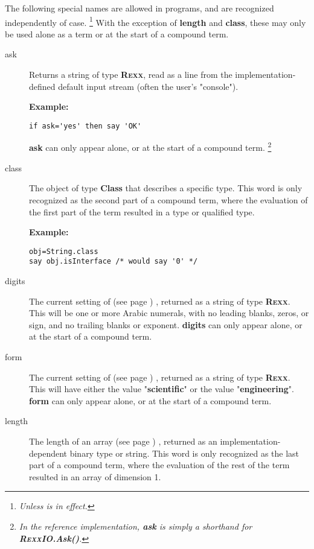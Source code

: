 The following special names are allowed in \nr{} programs, and are
recognized independently of case.
\footnote{
\emph{Unless  is in effect.
}
}
With the exception of \textbf{length} and \textbf{class}, these
may only be used alone as a term or at the start of a compound term.
\begin{description}
\item[ask]\label{refswask}
 
Returns a string of type \textbf{R\textsc{exx}}, read as a line from the
implementation-defined default input stream (often the user's
"console").

\textbf{Example:}
\begin{lstlisting}
if ask='yes' then say 'OK'
\end{lstlisting}
 \textbf{ask} can only appear alone, or at the start of a
compound term.
\footnote{
\emph{In the reference implementation, \textbf{ask} is simply a shorthand
for \textbf{R\textsc{exx}IO.Ask()}.}
}
\item[class]\label{refswclass}
 
The object of type \textbf{Class} that describes a specific type.
This word is only recognized as the second part of a compound term,
where the evaluation of the first part of the term resulted in a
type or qualified type.

\textbf{Example:}
\begin{lstlisting}
obj=String.class
say obj.isInterface /* would say '0' */
\end{lstlisting}
\item[digits]\label{refswdigit}
 The current setting of   (see page \pageref{refndigits}) ,
returned as a string of type \textbf{R\textsc{exx}}.
This will be one or more Arabic numerals, with no leading blanks, zeros,
or sign, and no trailing blanks or exponent.
 \textbf{digits} can only appear alone, or at the start of a
compound term.
\item[form]\label{refswform}
 The current setting of   (see page \pageref{refnform}) ,
returned as a string of type \textbf{R\textsc{exx}}.
This will have either the value "\textbf{scientific}" or the
value "\textbf{engineering}".
 \textbf{form} can only appear alone, or at the start of a
compound term.
\item[length]\label{refswleng}
 The length of an  array (see page \pageref{refarray}) , returned as an
implementation-dependent binary type or string.
This word is only recognized as the last part of a compound term,
where the evaluation of the rest of the term resulted in an array of
dimension 1.
 

\end{description}
